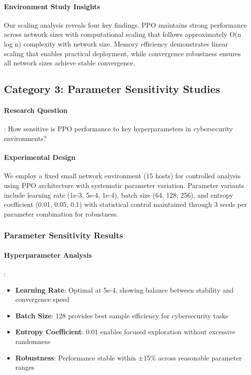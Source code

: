 \documentclass[12pt,oneside]{article}
\begin{document}
\paragraph{Environment Study Insights} Our scaling analysis reveals four key findings. PPO maintains strong performance across network sizes with computational scaling that follows approximately O(n log n) complexity with network size. Memory efficiency demonstrates linear scaling that enables practical deployment, while convergence robustness ensures all network sizes achieve stable convergence.

\subsection{Category 3: Parameter Sensitivity Studies}

\paragraph{Research Question}: How sensitive is PPO performance to key hyperparameters in cybersecurity environments?

\paragraph{Experimental Design} We employ a fixed small network environment (15 hosts) for controlled analysis using PPO architecture with systematic parameter variation. Parameter variants include learning rate (1e-3, 5e-4, 1e-4), batch size (64, 128, 256), and entropy coefficient (0.01, 0.05, 0.1) with statistical control maintained through 3 seeds per parameter combination for robustness.

\subsubsection{Parameter Sensitivity Results}

\paragraph{Hyperparameter Analysis}:
\begin{itemize}
\item \textbf{Learning Rate}: Optimal at 5e-4, showing balance between stability and convergence speed
\item \textbf{Batch Size}: 128 provides best sample efficiency for cybersecurity tasks
\item \textbf{Entropy Coefficient}: 0.01 enables focused exploration without excessive randomness
\item \textbf{Robustness}: Performance stable within ±15\% across reasonable parameter ranges
\end{itemize}
\end{document}
